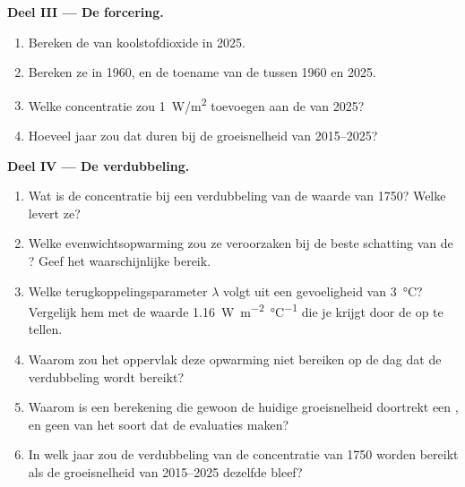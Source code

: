 \begin{problem}
\medskip
\noindent\textbf{Deel III --- De forcering.}
\begin{enumerate}[resume]
  \item Bereken de  van koolstofdioxide in 2025.
  \item Bereken ze in 1960, en de toename van de  tussen 1960
        en 2025.
  \item Welke concentratie zou \qty{1}{W/m^2} toevoegen aan de  van 2025?
  \item Hoeveel jaar zou dat duren bij de groeisnelheid van 2015--2025?
\end{enumerate}

\medskip
\noindent\textbf{Deel IV --- De verdubbeling.}
\begin{enumerate}[resume]
  \item Wat is de concentratie bij een verdubbeling van de waarde van 1750? Welke
         levert ze?
  \item Welke evenwichtsopwarming zou ze veroorzaken bij de beste schatting van de ?
        Geef het waarschijnlijke bereik.
  \item Welke terugkoppelingsparameter $\lambda$ volgt uit een gevoeligheid van
        \qty{3}{\degreeCelsius}? Vergelijk hem met de waarde
        \qty{1.16}{W.m^{-2}.\degreeCelsius^{-1}} die je krijgt door de
         op te tellen.
  \item Waarom zou het oppervlak deze opwarming niet bereiken op de dag dat de
        verdubbeling wordt bereikt?
  \item Waarom is een berekening die gewoon de huidige groeisnelheid doortrekt een
        , en geen  van het soort dat de evaluaties maken?
  \item In welk jaar zou de verdubbeling van de concentratie van 1750 worden bereikt
        als de groeisnelheid van 2015--2025 dezelfde bleef?
\end{enumerate}
\end{problem}

